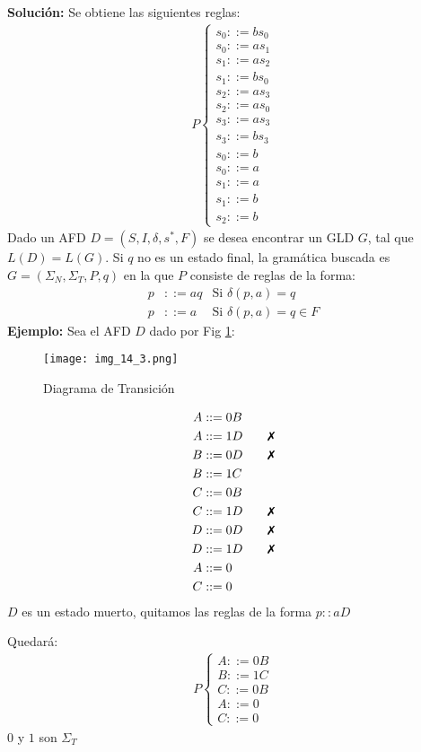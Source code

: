 \textbf{Solución: }Se obtiene las siguientes reglas:
\begin{align*}
P\left \{ \begin{array}{c}
s_0::=bs_0	\\
s_0::=as_1	\\
s_1::=as_2	\\
s_1::=bs_0	\\
s_2::=as_3	\\
s_2::=as_0	\\
s_3::=as_3	\\
s_3::=bs_3	\\
s_0::=b	\\
s_0::=a	\\
s_1::=a	\\
s_1::=b	\\
s_2::=b
\end{array}\right.
\end{align*}
Dado un AFD $D=(S,I,\delta,s^*,F)$ se desea encontrar un GLD $G$, tal que $L(D)=L(G)$. Si $q$ no es un estado final, la gramática buscada es $G=(\Sigma_N,\Sigma_T,P,q)$ en la que $P$ consiste de reglas de la forma: 
\begin{align*}
p&::=aq	&\mbox{Si }\delta(p,a)=q	\\
p&::=a	&\mbox{Si }\delta(p,a)=q\in F
\end{align*}
\textbf{Ejemplo: }Sea el AFD $D$ dado por Fig \ref{img_14_3}:
\begin{figure}[h!]
\centering
\texttt{[image: img\_14\_3.png]}
\caption{Diagrama de Transición}\label{img_14_3}
\end{figure}
\begin{align*}
A&::=0B	\\
A&::=1D\qquad\xmark	\\
B&::=0D\qquad\xmark	\\
B&::=1C	\\
C&::=0B	\\
C&::=1D\qquad\xmark	\\
D&::=0D\qquad\xmark	\\
D&::=1D\qquad\xmark	\\
A&::=0	\\
C&::=0
\end{align*}
$D$ es un estado muerto, quitamos las reglas de la forma $p::aD$

Quedará:
\begin{align*}
P\left \{ \begin{array}{c}
A::=0B	\\
B::=1C	\\
C::=0B	\\
A::=0	\\
C::=0
\end{array}\right.
\end{align*}
$0$ y $1$ son $\Sigma_T$

